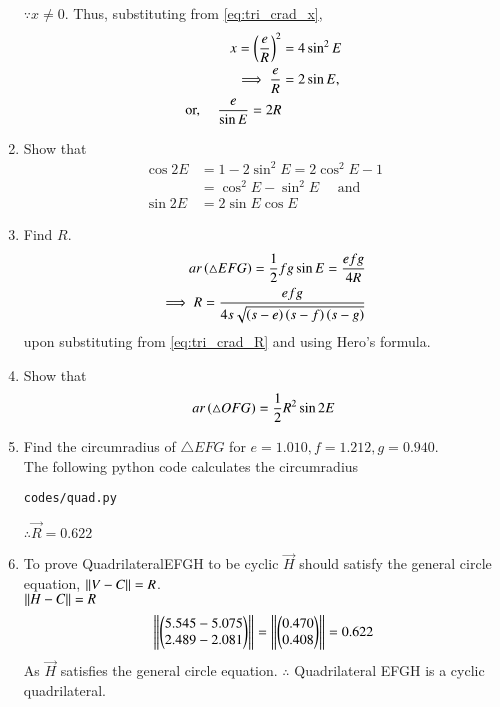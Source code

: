 \begin{enumerate}[label=\thesection.\arabic*.,ref=\thesection.\theenumi]
%
$\because x \ne 0$.  Thus, substituting from \eqref{eq:tri_crad_x},
\begin{align}
x = \left(\frac{e}{R}\right)^2 &= 4 \sin^2 E 
\\
\implies \frac{e}{R} &= 2\sin E,
\\
\text{or, }\quad \frac{e}{\sin E} = 2R
\end{align}
%
\item Show that 
\label{eq:cos2x}
\begin{align}
\cos 2E &= 1 -2\sin^2 E = 2\cos^2 E - 1 
\\
&= \cos^2 E - \sin^2E \quad \text{ and }
\\
\sin 2E &= 2 \sin E \cos E
\label{eq:sin2x}
\end{align}
\item Find $R$.
\\
\solution
\begin{align}
ar\left(\triangle EFG\right) = \frac{1}{2}fg \sin E = \frac{efg}{4R}&
\\
\implies R = \frac{efg}{4s\sqrt{\left(s-e\right)\left(s-f\right)\left(s-g\right)}}&
\end{align}
%
upon substituting from \eqref{eq:tri_crad_R} and using Hero's formula.
%
\item Show that
%
\begin{align}
\label{eq:circ_area_chord}
ar\left(\triangle OFG\right) = \frac{1}{2}R^2\sin 2E
\end{align}
%
\item Find the circumradius of $\triangle EFG$ for $e =1.010, f =1.212, g =0.940$.
%
\\
\solution The following python code calculates the circumradius
\begin{lstlisting}
codes/quad.py
\end{lstlisting}
$\therefore \vec{R}=0.622$

\item To prove QuadrilateralEFGH to be cyclic
$\vec{H}$ should satisfy the general circle equation, $\left\lVert V-C\right\rVert=R$.
\\
$\left\lVert H-C\right\rVert=R$
\begin{align}
\left\lVert\begin{pmatrix}5.545-5.075\\2.489-2.081\end{pmatrix}\right\rVert=
\left\lVert\begin{pmatrix}0.470\\0.408\end{pmatrix}\right\rVert=0.622
\end{align}
As $\vec{H}$ satisfies the general circle equation.
\newline
$\therefore$ Quadrilateral EFGH is a cyclic quadrilateral.
\end{enumerate}
